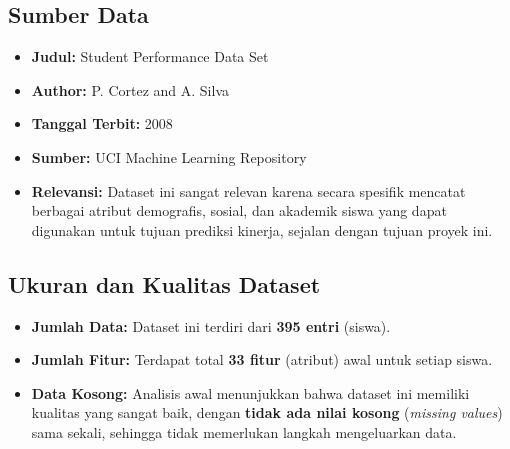 \subsection{Sumber Data}
\begin{itemize}
    \item \textbf{Judul:} Student Performance Data Set
    \item \textbf{Author:} P. Cortez and A. Silva
    \item \textbf{Tanggal Terbit:} 2008
    \item \textbf{Sumber:} UCI Machine Learning Repository
    \item \textbf{Relevansi:} Dataset ini sangat relevan karena secara spesifik mencatat berbagai atribut demografis, sosial, dan akademik siswa yang dapat digunakan untuk tujuan prediksi kinerja, sejalan dengan tujuan proyek ini.
\end{itemize}

\subsection{Ukuran dan Kualitas Dataset}
\begin{itemize}
    \item \textbf{Jumlah Data:} Dataset ini terdiri dari \textbf{395 entri} (siswa).
    \item \textbf{Jumlah Fitur:} Terdapat total \textbf{33 fitur} (atribut) awal untuk setiap siswa.
    \item \textbf{Data Kosong:} Analisis awal menunjukkan bahwa dataset ini memiliki kualitas yang sangat baik, dengan \textbf{tidak ada nilai kosong} (\textit{missing values}) sama sekali, sehingga tidak memerlukan langkah mengeluarkan data.
\end{itemize}

